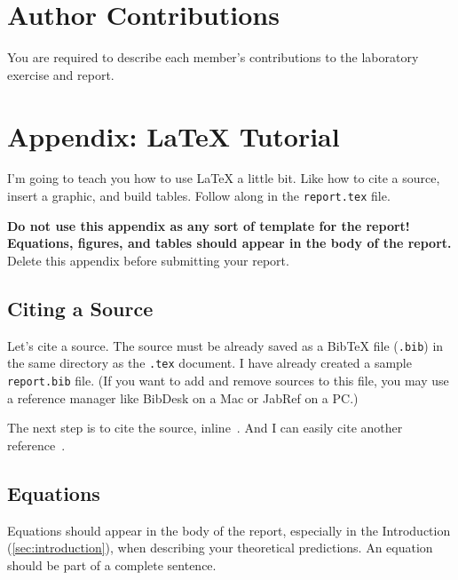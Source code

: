 \documentclass[10pt,twocolumn]{article}
\begin{document}
\section{Author Contributions}

You are required to describe each member's contributions to the laboratory exercise and report.






\appendix

\section{Appendix: \LaTeX{} Tutorial}\label{sec:latex}

I'm going to teach you how to use \LaTeX{} a little bit. Like how to cite a source, insert a graphic, and build tables. Follow along in the \texttt{report.tex} file.

{\bfseries\color{red} Do not use this appendix as any sort of template for the report! Equations, figures, and tables should appear in the body of the report.} Delete this appendix before submitting your report.

\subsection{Citing a Source}

Let's cite a source. The source must be already saved as a BibTeX file (\texttt{.bib}) in the same directory as the \texttt{.tex} document. I have already created a sample \texttt{report.bib} file. (If you want to add and remove sources to this file, you may use a reference manager like BibDesk on a Mac or JabRef on a PC.)

The next step is to cite the source, inline~\citep{Rowell1997}. And I can easily cite another reference~\citep{Ciesielski1997}.

\subsection{Equations}

Equations should appear in the body of the report, especially in the Introduction (\autoref{sec:introduction}), when describing your theoretical predictions. An equation should be part of a complete sentence.
\end{document}
